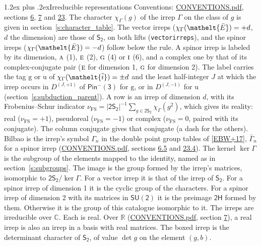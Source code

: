 \documentclass[10pt,a4paper]{article}
\makeatletter
\renewcommand\section{\@startsection{section}{1}{\z@}{-3ex plus -1ex minus -.2ex}%
  {1.2ex plus .2ex}{\normalfont\large\sffamily\bfseries\color{parttitle}}}
\numberwithin{equation}{section}
\newcommand{\eltfont}[1]{{\let\sigma\eltsigma\mathelt{#1}}}
\newcommand{\grp}[1]{\mathsf{#1}}
\newcommand{\irr}[1]{\text{\normalfont\scshape #1}}
\newcommand{\elt}[1]{\eltfont{#1}}
\newcommand{\ptag}[1]{\mathrm{#1}}
\newcommand{\irrJp}[2]{D^{(#1,#2)}}
\newcommand{\irchar}[1]{\chi_{#1}}
\newcommand{\fsind}{\nu_{\mathrm{FS}}}
\newcommand{\barred}[1]{\bar{#1}}
\newcommand{\lift}[1]{\tilde{#1}}
\makeatother
\begin{document}
\section{Irreducible representations}\label{s:irreps}
Conventions: \href{../../CONVENTIONS.pdf}{CONVENTIONS.pdf}, sections \href{../../../rotation/CONVENTIONS.pdf\#conv.6}{6}, \href{../../../rotation/CONVENTIONS.pdf\#conv.7}{7} and \href{../../CONVENTIONS.pdf\#conv.23}{23}.
\leavevmode\label{n:function.character}\label{n:irrep.Gamma}The character $\irchar{\Gamma}(g)$ of the irrep $\Gamma$ on the class of $g$ is given in section~\ref{s:character_table}. \label{n:index.dimension}The vector irreps ($\irchar{\Gamma}(\elt{\barred{E}}) = +d$, $d$ the dimension) are those of \href{../../../rotation/data/pdf/S2.pdf}{$\grp{S_{2}}$}, on both lifts (\texttt{vectorirreps}), and the spinor irreps ($\irchar{\Gamma}(\elt{\barred{E}}) = -d$) follow below the rule. A spinor irrep is labeled by its dimension, $\irr{a}$ (1), $\irr{e}$ (2), $\irr{g}$ (4) or $\irr{i}$ (6), and a complex one by that of its complex-conjugate pair ($\irr{e}$ for dimension 1, $\irr{g}$ for dimension 2). The label carries the tag $\ptag{g}$ or $\ptag{u}$ of $\irchar{\Gamma}(\elt{\lift{i}}) = \pm d$ and the least half-integer $J$ at which the irrep occurs in $\irrJp{J}{+1}$ of $\grp{Pin^{-}(3)}$ for $\ptag{g}$, or in $\irrJp{J}{-1}$ for $\ptag{u}$ (section~\ref{s:subduction_parent}).
\leavevmode\label{n:index.frobenius}\label{n:head.irrep}\label{n:head.reality}A row is an irrep of dimension $d$, with its Frobenius--Schur indicator $\fsind = |\grp{2S_{2}}|^{-1}\allowbreak\sum_{g\in\grp{2S_{2}}}\irchar{\Gamma}(g^2)$, which gives its reality: real ($\fsind = +1$), pseudoreal ($\fsind = -1$) or complex ($\fsind = 0$, paired with its conjugate). \label{n:head.conjugate}The column conjugate gives that conjugate (a dash for the others). \label{n:head.bilbao}\label{n:irrep.alias.gamma}Bilbao is the irrep's symbol $\Gamma_n$ in the double point group tables of [\href{../../../REFERENCES.pdf\#ref.EBW+17}{EBW+17}], $\bar{\Gamma}_n$ for a spinor irrep (\href{../../CONVENTIONS.pdf}{CONVENTIONS.pdf}, sections \href{../../../rotation/CONVENTIONS.pdf\#conv.6.5}{6.5} and \href{../../CONVENTIONS.pdf\#conv.23.4}{23.4}). \label{n:head.kernel}The kernel $\ker\Gamma$ is the subgroup of the elements mapped to the identity, named as in section~\ref{s:subgroups}. \label{n:head.image}The image is the group formed by the irrep's matrices, isomorphic to $\grp{2S_{2}}/\ker\Gamma$. For a vector irrep it is that of the irrep of \href{../../../rotation/data/pdf/S2.pdf}{$\grp{S_{2}}$}. For a spinor irrep of dimension 1 it is the cyclic group of the characters. For a spinor irrep of dimension 2 with its matrices in $\grp{SU(2)}$ it is the preimage $\grp{2H}$ formed by them. Otherwise it is the group of this catalogue isomorphic to it. The irreps are irreducible over $\mathbb{C}$. Each is real. Over $\mathbb{R}$ (\href{../../CONVENTIONS.pdf}{CONVENTIONS.pdf}, section \href{../../../rotation/CONVENTIONS.pdf\#conv.7}{7}), a real irrep is also an irrep in a basis with real matrices. \label{n:mark.determinant}The boxed irrep is the determinant character of \href{../../../rotation/data/pdf/S2.pdf}{$\grp{S_{2}}$}, of value $\det g$ on the element $(g, b)$.
\end{document}
